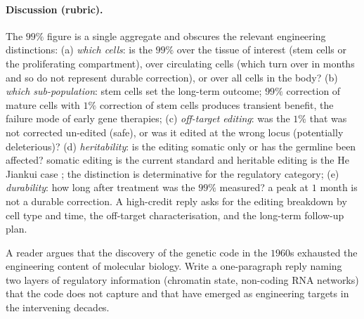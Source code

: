 \paragraph{Discussion (rubric).} The $99\%$ figure is a single
aggregate and obscures the relevant engineering distinctions:
(a) \emph{which cells}: is the $99\%$ over the tissue of interest
(stem cells or the proliferating compartment), over circulating cells
(which turn over in months and so do not represent durable correction),
or over all cells in the body? (b) \emph{which sub-population}:
stem cells set the long-term outcome; $99\%$ correction of
mature cells with $1\%$ correction of stem cells produces transient
benefit, the failure mode of early gene therapies; (c) \emph{off-target
editing}: was the $1\%$ that was not corrected un-edited (safe), or
was it edited at the wrong locus (potentially deleterious)?
(d) \emph{heritability}: is the editing somatic only or has the
germline been affected? somatic editing is the current standard and
heritable editing is the He Jiankui case
\cite{acc:he-jiankui-crispr-2018}; the distinction is determinative
for the regulatory category; (e) \emph{durability}: how long after
treatment was the $99\%$ measured? a peak at $1$ month is not a
durable correction. A high-credit reply asks for the editing
breakdown by cell type and time, the off-target characterisation, and
the long-term follow-up plan.

\begin{exercise}
A reader argues that the discovery of the genetic code in the
$1960$s exhausted the engineering content of molecular biology.
Write a one-paragraph reply naming two layers of regulatory
information (chromatin state, non-coding RNA networks) that the
code does not capture and that have emerged as engineering targets
in the intervening decades.
\end{exercise}

